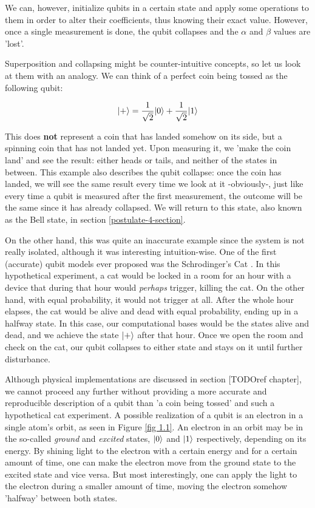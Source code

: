 We can, however, initialize qubits in a certain state and apply some operations to them in order to alter their coefficients, thus knowing their exact value. However, once a single measurement is done, the qubit collapses and the $\alpha$ and $\beta$ values are 'lost'.

Superposition and collapsing might be counter-intuitive concepts, so let us look at them with an analogy. We can think of a perfect coin being tossed as the following qubit:

$$ |+\rangle = \frac{1}{\sqrt{2}} |0\rangle + \frac{1}{\sqrt{2}} |1\rangle $$

This does \textbf{not} represent a coin that has landed somehow on its side, but a spinning coin that has not landed yet. Upon measuring it, we 'make the coin land' and see the result: either heads or tails, and neither of the states in between. This example also describes the qubit collapse: once the coin has landed, we will see the same result every time we look at it -obviously-, just like every time a qubit is measured after the first measurement, the outcome will be the same since it has already collapsed. We will return to this state, also known as the Bell state, in section \ref{postulate-4-section}.

On the other hand, this was quite an inaccurate example since the system is not really isolated, although it was interesting intuition-wise. One of the first (accurate) qubit models ever proposed was the Schrodinger's Cat \cite{Schrodinger1935} \cite{Trimmer1980}. In this hypothetical experiment, a cat would be locked in a room for an hour with a device that during that hour would \emph{perhaps} trigger, killing the cat. On the other hand, with equal probability, it would not trigger at all. After the whole hour elapses, the cat would be alive and dead with equal probability, ending up in a halfway state. In this case, our computational bases would be the states alive and dead, and we achieve the state $|+\rangle$ after that hour. Once we open the room and check on the cat, our qubit collapses to either state and stays on it until further disturbance.

Although physical implementations are discussed in section [TODOref chapter], we cannot proceed any further without providing a more accurate and reproducible description of a qubit than 'a coin being tossed' and such a hypothetical cat experiment. A possible realization of a qubit is an electron in a single atom's orbit, as seen in Figure \ref{fig 1.1}. An electron in an orbit may be in the so-called \emph{ground} and \emph{excited} states, $|0\rangle$ and $|1\rangle$ respectively, depending on its energy. By shining light to the electron with a certain energy and for a certain amount of time, one can make the electron move from the ground state to the excited state and vice versa. But most interestingly, one can apply the light to the electron during a smaller amount of time, moving the electron somehow 'halfway' between both states.

